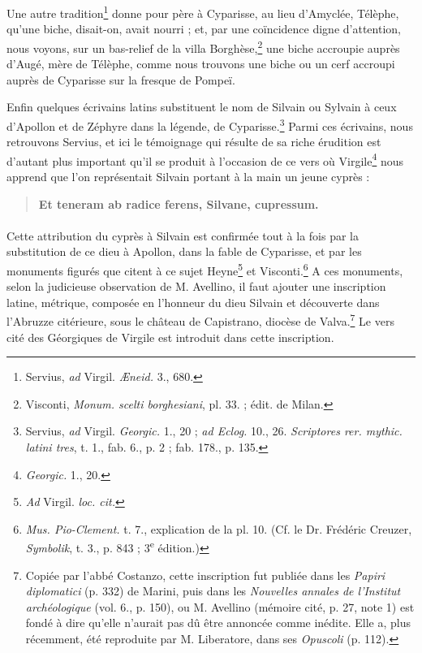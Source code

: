 \documentclass{article}
\begin{document}
Une autre tradition\footnote{Servius, \emph{ad} Virgil. \emph{Æneid.} 3., 680.} donne pour père à Cyparisse, au lieu d'Amyclée, Télèphe, qu'une biche, disait-on, avait nourri ; et, par une coïncidence digne d'attention, nous voyons, sur un bas-relief de la villa Borghèse,\footnote{Visconti, \emph{Monum. scelti borghesiani}, pl. 33. ; édit. de Milan.} une biche accroupie auprès d'Augé, mère de Télèphe, comme nous trouvons une biche ou un cerf accroupi auprès de Cyparisse sur la fresque de Pompeï.

Enfin quelques écrivains latins substituent le nom de Silvain ou Sylvain à ceux d'Apollon et de Zéphyre dans la légende, de Cyparisse.\footnote{Servius, \emph{ad} Virgil. \emph{Georgic.} 1., 20 ; \emph{ad Eclog.} 10., 26. \emph{Scriptores rer. mythic. latini tres}, t. 1., fab. 6., p. 2 ; fab. 178., p. 135.} Parmi ces écrivains, nous retrouvons Servius, et ici le témoignage qui résulte de sa riche érudition est d'autant plus important qu'il se produit à l'occasion de ce vers où Virgile\footnote{\emph{Georgic.} 1., 20.} nous apprend que l'on représentait Silvain portant à la main un jeune cyprès :

\begin{quotation}\scriptsize\bfseries
Et teneram ab radice ferens, Silvane, cupressum.
\end{quotation}

\paragraph{}
Cette attribution du cyprès à Silvain est confirmée tout à la fois par la substitution de ce dieu à Apollon, dans la fable de Cyparisse, et par les monuments figurés que citent à ce sujet Heyne\footnote{\emph{Ad} Virgil. \emph{loc. cit.}} et Visconti.\footnote{\emph{Mus. Pio-Clement.} t. 7., explication de la pl. 10. (Cf. le Dr. Frédéric Creuzer, \emph{Symbolik}, t. 3., p. 843 ; 3\textsuperscript{e} édition.)} A ces monuments, selon la judicieuse observation de M. Avellino, il faut ajouter une inscription latine, métrique, composée en l'honneur du dieu Silvain et découverte dans l'Abruzze citérieure, sous le château de Capistrano, diocèse de Valva.\footnote{Copiée par l'abbé Costanzo, cette inscription fut publiée dans les \emph{Papiri diplomatici} (p. 332) de Marini, puis dans les \emph{Nouvelles annales de l'Institut archéologique} (vol. 6., p. 150), ou M. Avellino (mémoire cité, p. 27, note 1) est fondé à dire qu'elle n'aurait pas dû être annoncée comme inédite. Elle a, plus récemment, été reproduite par M. Liberatore, dans ses \emph{Opuscoli} (p. 112).} Le vers cité des Géorgiques de Virgile est introduit dans cette inscription.
\end{document}
